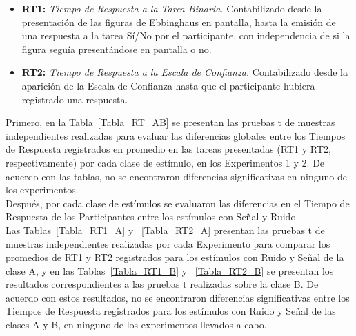 \begin{itemize}
\item \textbf{RT1:} \textit{Tiempo de Respuesta a la Tarea Binaria.}  Contabilizado desde la presentación de las figuras de Ebbinghaus en pantalla, hasta la emisión de una respuesta a la tarea Sí/No por el participante, con independencia de si la figura seguía presentándose en pantalla o no.\\

\item \textbf{RT2:} \textit{Tiempo de Respuesta a la Escala de Confianza.} Contabilizado desde la aparición de la Escala de Confianza hasta que el participante hubiera registrado una respuesta.\\
\end{itemize}

Primero, en la Tabla~\ref{Tabla_RT_AB} se presentan las pruebas t de muestras independientes realizadas para evaluar las diferencias globales entre los Tiempos de Respuesta registrados en promedio en las tareas presentadas (RT1 y RT2, respectivamente) por cada clase de estímulo, en los Experimentos 1 y 2. De acuerdo con las tablas, no se encontraron diferencias significativas en ninguno de los experimentos.\\

Después, por cada clase de estímulos se evaluaron las diferencias en el Tiempo de Respuesta de los Participantes entre los estímulos con Señal y Ruido.\\

Las Tablas~\ref{Tabla_RT1_A} y ~\ref{Tabla_RT2_A} presentan las pruebas t de muestras independientes realizadas por cada Experimento para comparar los promedios de RT1 y RT2 registrados para los estímulos con Ruido y Señal de la clase A, y en las Tablas~\ref{Tabla_RT1_B} y ~\ref{Tabla_RT2_B} se presentan los resultados correspondientes a las pruebas t realizadas sobre la clase B. De acuerdo con estos resultados, no se encontraron diferencias significativas entre los Tiempos de Respuesta registrados para los estímulos con Ruido y Señal de las clases A y B, en ninguno de los experimentos llevados a cabo.\\



